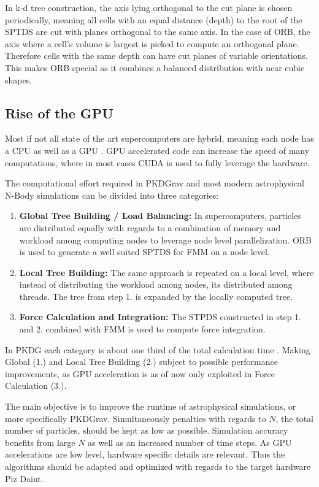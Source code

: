 \documentclass[]{article}
\begin{document}
In k-d tree construction, the axis lying orthogonal to the cut plane is chosen periodically, meaning all cells with an equal distance (depth) to the root of the SPTDS are cut with planes orthogonal to the same axis. In the case of ORB, the axis where a cell's volume is largest is picked to compute an orthogonal plane. Therefore cells with the same depth can have cut planes of variable orientations. This makes ORB special as it combines a balanced distribution with near cubic shapes.  

\subsection{Rise of the GPU}

Most if not all state of the art supercomputers are hybrid, meaning each node has a CPU as well as a GPU \cite{TOP500}. GPU accelerated code can increase the speed of many computations, where in most cases CUDA is used to fully leverage the hardware. 

The computational effort required in PKDGrav and most modern astrophysical N-Body simulations can be divided into three categories:

\begin{enumerate}
	\item \textbf{Global Tree Building / Load Balancing:} In supercomputers, particles are distributed equally with regards to a combination of memory and workload among computing nodes to leverage node level parallelization. ORB is used to generate a well suited SPTDS for FMM on a node level.
	\item \textbf{Local Tree Building:} The same approach is repeated on a local level, where instead of distributing the workload among nodes, its distributed among threads. The tree from step 1. is expanded by the locally computed tree.
	\item \textbf{Force Calculation and Integration:} The STPDS constructed in step 1. and 2. combined with FMM is used to compute force integration. 
\end{enumerate}

In PKDG each category is about one third of the total calculation time \cite{Stadel2001}. Making Global (1.) and Local Tree Building (2.) subject to possible performance improvements, as GPU acceleration is as of now only exploited in Force Calculation (3.).

The main objective is to improve the runtime of astrophysical simulations, or more specifically PKDGrav. Simultaneously penalties with regards to $N$, the total number of particles, should be kept as low as possible. Simulation accuracy benefits from large $N$ as well as an increased number of time steps. As GPU accelerations are low level, hardware specific details are relevant. Thus the algorithms should be adapted and optimized with regards to the target hardware Piz Daint.
\end{document}
